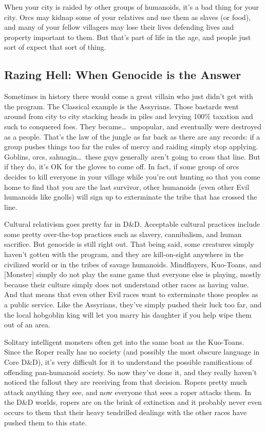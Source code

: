 When your city is raided by other groups of humanoids, it's a bad thing for your city. Orcs may kidnap some of your relatives and use them as slaves (or food), and many of your fellow villagers may lose their lives defending lives and property important to them. But that's part of life in the age, and people just sort of expect that sort of thing.

\subsection{Razing Hell: When Genocide is the Answer}

Sometimes in history there would come a great villain who just didn't get with the program. The Classical example is the Assyrians. Those bastards went around from city to city stacking heads in piles and levying 100\% taxation and such to conquered foes. They became\ldots\  unpopular, and eventually were destroyed as a people. That's the law of the jungle as far back as there are any records: if a group pushes things too far the rules of mercy and raiding simply stop applying. Goblins, orcs, sahuagin\ldots\  these guys generally aren't going to cross that line. But if they do, it's OK for the gloves to come off. In fact, if some group of orcs decides to kill everyone in your village while you're out hunting so that you come home to find that you are the last survivor, other humanoids (even other Evil humanoids like gnolls) will sign up to exterminate the tribe that has crossed the line.

Cultural relativism goes pretty far in D\&D. Acceptable cultural practices include some pretty over-the-top practices such as slavery, cannibalism, and human sacrifice. But genocide is still right out. That being said, some creatures simply haven't gotten with the program, and they are kill-on-sight anywhere in the civilized world or in the tribes of savage humanoids. Mindflayers, Kuo-Toans, and [Monster] simply do not play the same game that everyone else is playing, mostly because their culture simply does not understand other races as having value. And that means that even other Evil races want to exterminate those peoples as a public service. Like the Assyrians, they've simply pushed their luck too far, and the local hobgoblin king will let you marry his daughter if you help wipe them out of an area.

Solitary intelligent monsters often get into the same boat as the Kuo-Toans. Since the Roper really has no society (and possibly the most obscure language in Core D\&D), it's very difficult for it to understand the possible ramifications of offending pan-humanoid society. So now they've done it, and they really haven't noticed the fallout they are receiving from that decision. Ropers pretty much attack anything they see, and now everyone that sees a roper attacks them. In the D\&D worlds, ropers are on the brink of extinction and it probably never even occurs to them that their heavy tendrilled dealings with the other races have pushed them to this state.

